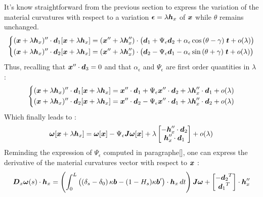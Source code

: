 It's know straightforward from the previous section to express the variation of the material curvatures with respect to a variation $\boldsymbol{\epsilon} =\lambda \boldsymbol{h}_x$ of $\boldsymbol{x}$ while $\theta$ remains unchanged.
\begin{equation}
	\left\{
		\begin{aligned}
			&(\boldsymbol{x}+\lambda \boldsymbol{h}_x)'' \cdot \boldsymbol{d}_1[\boldsymbol{x}+\lambda \boldsymbol{h}_x] = 
				(\boldsymbol{x}''+\lambda \boldsymbol{h}_x'')\cdot\big(\boldsymbol{d}_1 + \Psi_\epsilon\boldsymbol{d}_2
				+ \alpha_\epsilon\cos{(\theta-\gamma)}\;\boldsymbol{t} + o(\lambda)\big) \\
			&(\boldsymbol{x}+\lambda \boldsymbol{h}_x)'' \cdot \boldsymbol{d}_2[\boldsymbol{x}+\lambda \boldsymbol{h}_x] = 
				(\boldsymbol{x}''+\lambda \boldsymbol{h}_x'')\cdot\big(\boldsymbol{d}_2 - \Psi_\epsilon\boldsymbol{d}_1
			- \alpha_\epsilon\sin{(\theta+\gamma)}\;\boldsymbol{t} + o(\lambda)\big) \\
		\end{aligned}
		\right.
\end{equation}
Thus, recalling that $\boldsymbol{x}''\cdot\boldsymbol{d}_3 = 0$ and that $\alpha_\epsilon$ and $\Psi_\epsilon$ are first order quantities in $\lambda$ :
\begin{equation}
	\left\{
		\begin{aligned}
			&(\boldsymbol{x}+\lambda \boldsymbol{h}_x)'' \cdot \boldsymbol{d}_1[\boldsymbol{x}+\lambda \boldsymbol{h}_x] = 
				\boldsymbol{x}''\cdot\boldsymbol{d}_1 + \Psi_\epsilon\boldsymbol{x}''\cdot\boldsymbol{d}_2 + \lambda \boldsymbol{h}_x''\cdot\boldsymbol{d}_1
				+ o(\lambda)\\
			&(\boldsymbol{x}+\lambda \boldsymbol{h}_x)'' \cdot \boldsymbol{d}_2[\boldsymbol{x}+\lambda \boldsymbol{h}_x] = 
				\boldsymbol{x}''\cdot\boldsymbol{d}_2 - \Psi_\epsilon\boldsymbol{x}''\cdot\boldsymbol{d}_1 +  \lambda \boldsymbol{h}_x''\cdot\boldsymbol{d}_2
				+ o(\lambda)\\
		\end{aligned}
		\right.
\end{equation}
Which finally leads to :
\begin{equation}
		\boldsymbol{\omega}[\boldsymbol{x}+\lambda \boldsymbol{h}_x]  = 
		\boldsymbol{\omega}[\boldsymbol{x}] - \Psi_\epsilon\boldsymbol{\mathit{J}}\boldsymbol{\omega}[\boldsymbol{x}]+\lambda
		\begin{bmatrix}
			-\boldsymbol{h}_x''\cdot\boldsymbol{d}_2\\
			\boldsymbol{h}_x''\cdot\boldsymbol{d}_1\\
		\end{bmatrix} + o(\lambda)
\end{equation}
Reminding the expression of $\Psi_\epsilon$ computed in paragraphe[], one can express the derivative of the material curvatures vector with respect to $\boldsymbol{x}$ :
\begin{equation}
			\boldsymbol{D}_x\boldsymbol{\omega}(s)\cdot\boldsymbol{h}_x
	= 	\left(\int_0^L \left(\left(\delta_s-\delta_0\right)\kappa\boldsymbol{b} - (1-H_s)\kappa\boldsymbol{b}'\right)\cdot  \boldsymbol{h}_x \,dt\right)\boldsymbol{\mathit{J}}\boldsymbol{\omega}+
		\begin{bmatrix}
			-{\boldsymbol{d}_2}^T\\
			{\boldsymbol{d}_1}^T\\
		\end{bmatrix}\cdot \boldsymbol{h}_x''
\end{equation}


